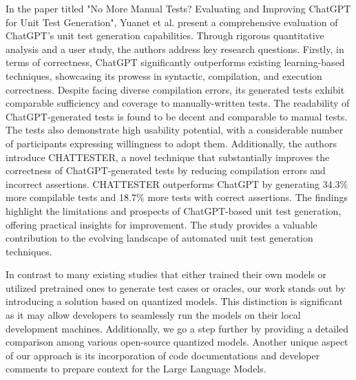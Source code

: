 In the paper titled "No More Manual Tests? Evaluating and Improving ChatGPT for Unit Test Generation"\cite{yuan_no_2023}, Yuanet et al. present a comprehensive evaluation of ChatGPT's unit test generation capabilities. Through rigorous quantitative analysis and a user study, the authors address key research questions. Firstly, in terms of correctness, ChatGPT significantly outperforms existing learning-based techniques, showcasing its prowess in syntactic, compilation, and execution correctness. Despite facing diverse compilation errors, its generated tests exhibit comparable sufficiency and coverage to manually-written tests. The readability of ChatGPT-generated tests is found to be decent and comparable to manual tests. The tests also demonstrate high usability potential, with a considerable number of participants expressing willingness to adopt them. Additionally, the authors introduce CHATTESTER\cite{yuan_no_2023}, a novel technique that substantially improves the correctness of ChatGPT-generated tests by reducing compilation errors and incorrect assertions. CHATTESTER outperforms ChatGPT by generating 34.3\% more compilable tests and 18.7\% more tests with correct assertions. The findings highlight the limitations and prospects of ChatGPT-based unit test generation, offering practical insights for improvement. The study provides a valuable contribution to the evolving landscape of automated unit test generation techniques.

In contrast to many existing studies that either trained\cite{tufano_generating_2022} their own models or utilized pretrained\cite{tufano_unit_2021} ones to generate test cases or oracles, our work stands out by introducing a solution based on quantized models. This distinction is significant as it may allow developers to seamlessly run the models on their local development machines. Additionally, we go a step further by providing a detailed comparison among various open-source quantized models. Another unique aspect of our approach is its incorporation of code documentations and developer comments to prepare context for the Large Language Models.